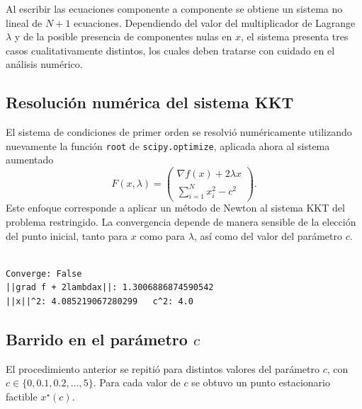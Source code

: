 \documentclass[11pt,a4paper]{article}
\begin{document}
Al escribir las ecuaciones componente a componente se obtiene un sistema no lineal de \(N+1\) ecuaciones. Dependiendo del valor del multiplicador de Lagrange \(\lambda\) y de la posible presencia de componentes nulas en \(x\), el sistema presenta tres casos cualitativamente distintos, los cuales deben tratarse con cuidado en el análisis numérico.

\subsection{Resolución numérica del sistema KKT}

El sistema de condiciones de primer orden se resolvió numéricamente utilizando nuevamente la función \texttt{root} de \texttt{scipy.optimize}, aplicada ahora al sistema aumentado
\[
F(x,\lambda)=
\begin{pmatrix}
\nabla f(x)+2\lambda x\\
\sum_{i=1}^N x_i^2-c^2
\end{pmatrix}.
\]
Este enfoque corresponde a aplicar un método de Newton al sistema KKT del problema restringido. La convergencia depende de manera sensible de la elección del punto inicial, tanto para \(x\) como para \(\lambda\), así como del valor del parámetro \(c\).
\begin{verbatim}

Converge: False
||grad f + 2lambdax||: 1.3006886874590542
||x||^2: 4.085219067280299   c^2: 4.0

\end{verbatim}

\subsection{Barrido en el parámetro \(c\)}
El procedimiento anterior se repitió para distintos valores del parámetro \(c\), con \(c\in\{0,0.1,0.2,\dots,5\}\). Para cada valor de \(c\) se obtuvo un punto estacionario factible \(x^\star(c)\).
\end{document}
